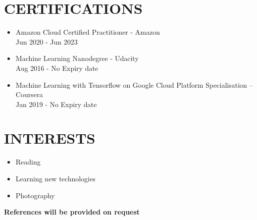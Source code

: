 \documentclass[margin]{res}
\begin{document}
\begin{resume}
\section{CERTIFICATIONS }
\begin{itemize}
\item Amazon Cloud Certified Practitioner - Amazon   \\ Jun 2020 - Jun 2023
\item Machine Learning Nanodegree - Udacity  \\ Aug 2016 - No Expiry date
\item Machine Learning with Tensorflow on Google Cloud Platform Specialisation – Coursera \\ Jan 2019 - No Expiry date
\end{itemize}


\section{INTERESTS}
\begin{itemize}
\item Reading
\item Learning new technologies
\item Photography
\end{itemize}

 {\textbf{References will be provided on request}}
\end{resume}
\end{document}
